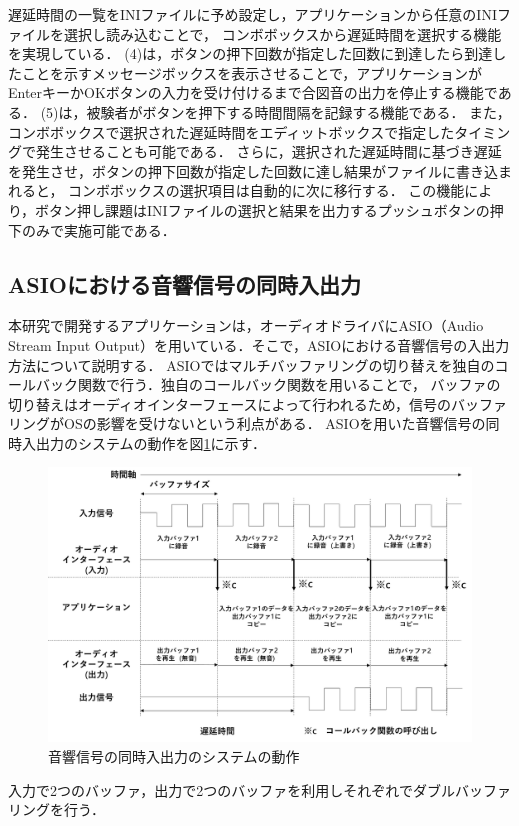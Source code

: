 遅延時間の一覧をINIファイルに予め設定し，アプリケーションから任意のINIファイルを選択し読み込むことで，
コンボボックスから遅延時間を選択する機能を実現している．
(4)は，ボタンの押下回数が指定した回数に到達したら到達したことを示すメッセージボックスを表示させることで，アプリケーションがEnterキーかOKボタンの入力を受け付けるまで合図音の出力を停止する機能である．
(5)は，被験者がボタンを押下する時間間隔を記録する機能である．
また，コンボボックスで選択された遅延時間をエディットボックスで指定したタイミングで発生させることも可能である．
さらに，選択された遅延時間に基づき遅延を発生させ，ボタンの押下回数が指定した回数に達し結果がファイルに書き込まれると，
コンボボックスの選択項目は自動的に次に移行する．
この機能により，ボタン押し課題はINIファイルの選択と結果を出力するプッシュボタンの押下のみで実施可能である．
\subsection{ASIOにおける音響信号の同時入出力}
本研究で開発するアプリケーションは，オーディオドライバにASIO（Audio Stream Input Output）を用いている．そこで，ASIOにおける音響信号の入出力方法について説明する．
ASIOではマルチバッファリングの切り替えを独自のコールバック関数で行う．独自のコールバック関数を用いることで，
バッファの切り替えはオーディオインターフェースによって行われるため，信号のバッファリングがOSの影響を受けないという利点がある．
ASIOを用いた音響信号の同時入出力のシステムの動作を図\ref{fig:delay_theory}に示す．
\begin{figure}[tbp]
  \centering
  \includegraphics[scale=0.12]{figures/System/Delay_theory_2.pdf}
  \caption{音響信号の同時入出力のシステムの動作}
  \label{fig:delay_theory}
\end{figure}
入力で2つのバッファ，出力で2つのバッファを利用しそれぞれでダブルバッファリングを行う．
